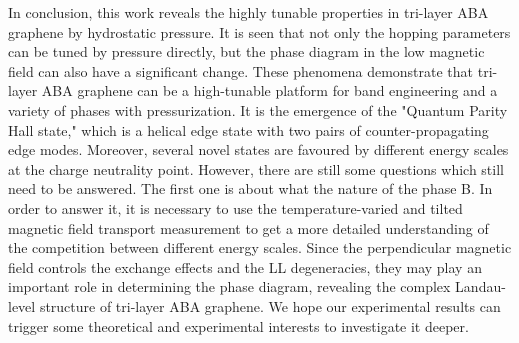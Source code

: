In conclusion, this work reveals the highly tunable properties in tri-layer ABA graphene by hydrostatic pressure. 
It is seen that not only the hopping parameters can be tuned by pressure directly, but the phase diagram in the low magnetic field can also have a significant change. 
These phenomena demonstrate that tri-layer ABA graphene can be a high-tunable platform for band engineering and a variety of phases with pressurization. 
It is the emergence of the "Quantum Parity Hall state," which is a helical edge state with two pairs of counter-propagating edge modes. 
Moreover, several novel states are favoured by different energy scales at the charge neutrality point. 
However, there are still some questions which still need to be answered. 
The first one is about what the nature of the phase B. 
In order to answer it, it is necessary to use the temperature-varied and tilted magnetic field transport measurement to get a more detailed understanding of the competition between different energy scales. 
Since the perpendicular magnetic field controls the exchange effects and the LL degeneracies, they may play an important role in determining the phase diagram, 
revealing the complex Landau-level structure of tri-layer ABA graphene. 
We hope our experimental results can trigger some theoretical and experimental interests to investigate it deeper.